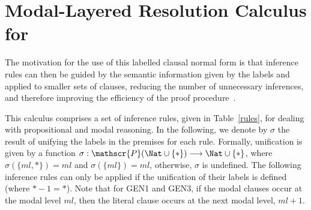 \begin{example}
    
\end{example}

\section{Modal-Layered Resolution Calculus for }

The motivation for the use of this labelled clausal normal form is that
inference rules can then be guided by the semantic information given by the
labels and applied to smaller sets of clauses, reducing the number of
unnecessary inferences, and therefore improving the efficiency of the proof
procedure~\cite{Nalon2016}. 

This calculus comprises a set of inference rules, given in Table~\ref{rules},
for dealing with propositional and modal reasoning. In the following, we denote
by $\sigma$ the result of unifying the labels in the premises for each rule.
Formally, unification is given by a function $ \sigma : \mathscr{P}(\Nat \cup
\{*\}) \longrightarrow \Nat \cup \{*\}$, where $\sigma (\{ml, *\}) = ml$ and
$\sigma (\{ml\}) = ml$, otherwise, $\sigma$ is undefined. The following
inference rules can only be applied if the unification of their labels is
defined (where $* - 1 = *$). Note that for GEN1 and GEN3, if the
modal clauses occur at the modal level $ml$, then the literal clause occurs at
the next modal level, $ml + 1$.




\section{\ksp}
